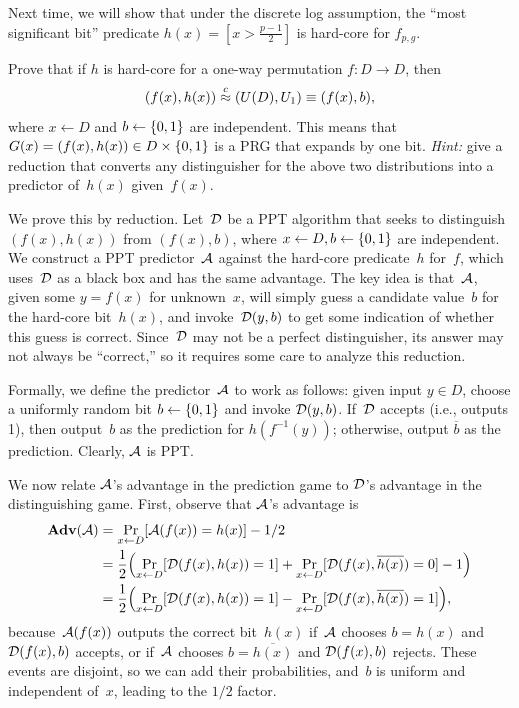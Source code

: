 \documentclass[11pt]{article}
\begin{document}
Next time, we will show that under the discrete log assumption, the ``most significant bit'' predicate $h(x) = [x > \frac{p-1}{2}]$ is hard-core for $f_{p,g}$.

\begin{question}
  Prove that if $h$ is hard-core for a one-way permutation $f \colon D \to D$, then
  \[ (f(x),h(x)) \stackrel{c}{\approx} (U(D),U_1) \equiv (f(x),b), \] where $x \gets D$ and $b \gets \{0,1\}$ are independent.
  This means that $G(x)=(f(x),h(x)) \in D \times \{0,1\}$ is a PRG that expands by one bit.
  \emph{Hint:} give a reduction that converts any distinguisher for the above two distributions into a predictor of~$h(x)$ given~$f(x)$.
\end{question}

\begin{answer}
  We prove this by reduction.
  Let~$\mathcal{D}$ be a PPT algorithm that seeks to distinguish $(f(x),h(x))$ from $(f(x), b)$, where $x \gets D, b \gets \{0,1\}$ are independent.
  We construct a PPT predictor~$\mathcal{A}$ against the hard-core predicate~$h$ for~$f$, which uses~$\mathcal{D}$ as a black box and has the same advantage.
  The key idea is that~$\mathcal{A}$, given some $y=f(x)$ for unknown~$x$, will simply guess a candidate value~$b$ for the hard-core bit~$h(x)$, and invoke~$\mathcal{D}(y,b)$ to get some indication of whether this guess is correct.
  Since~$\mathcal{D}$ may not be a perfect distinguisher, its answer may not always be ``correct,'' so it requires some care to analyze this reduction.

  Formally, we define the predictor~$\mathcal{A}$ to work as follows: given input $y \in D$, choose a uniformly random bit $b \gets \{0,1\}$ and invoke $\mathcal{D}(y,b)$.
  If~$\mathcal{D}$ accepts (i.e., outputs 1), then output~$b$ as the prediction for $h(f^{-1}(y))$; otherwise, output $\overline{b}$ as the prediction.
  Clearly, $\mathcal{A}$ is PPT.

  We now relate $\mathcal{A}$'s advantage in the prediction game to $\mathcal{D}$'s advantage in the distinguishing game.
  First, observe that $\mathcal{A}$'s advantage is
  \begin{align*}
    \advan(\AdvA)
    &= \Pr_{x \gets D}[\AdvA(f(x))=h(x)] - 1/2 \\
    &= \frac12 \parens*{\Pr_{x \gets D}[\calD(f(x),h(x))=1] + \Pr_{x
      \gets D}[\calD(f(x),\overline{h(x)})=0] - 1} \\
    &= \frac12 \parens*{\Pr_{x \gets D}[\calD(f(x),h(x))=1] - \Pr_{x
      \gets D}[\calD(f(x),\overline{h(x)})=1]},
  \end{align*}
  because~$\mathcal{A}(f(x))$ outputs the correct bit~$h(x)$ if~$\mathcal{A}$ chooses $b=h(x)$ and $\mathcal{D}(f(x),b)$ accepts, or if~$\mathcal{A}$ chooses $b=\overline{h(x)}$ and $\mathcal{D}(f(x),b)$ rejects.
  These events are disjoint, so we can add their probabilities, and~$b$ is uniform and independent of~$x$, leading to the $1/2$ factor.


\end{answer}
\end{document}
